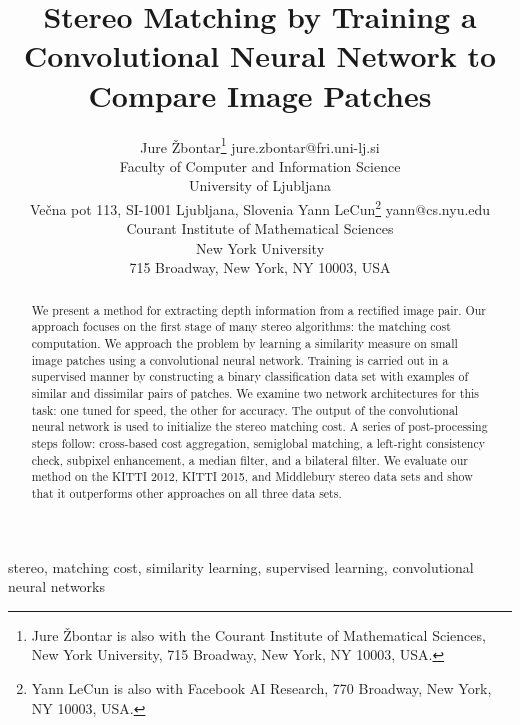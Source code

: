 \documentclass[twoside,11pt]{article}
\begin{document}
\title{Stereo Matching by Training a Convolutional Neural Network to Compare Image Patches}

\author{\name Jure \v{Z}bontar\thanks{
    Jure \v{Z}bontar is also with the
    \addr Courant Institute of Mathematical Sciences,
    New York University,
    715 Broadway, New York, NY 10003, USA.
} \email jure.zbontar@fri.uni-lj.si \\
\addr Faculty of Computer and Information Science\\
University of Ljubljana\\
Ve\v{c}na pot 113, SI-1001 Ljubljana, Slovenia
\AND
\name Yann LeCun\thanks{
    Yann LeCun is also with
    \addr Facebook AI Research,
    770 Broadway, New York, NY 10003, USA.
} \email yann@cs.nyu.edu \\
\addr Courant Institute of Mathematical Sciences\\
New York University\\
715 Broadway, New York, NY 10003, USA}


\maketitle

\begin{abstract}%
We present a method for extracting depth information from a rectified image
pair. Our approach focuses on the first stage of many stereo algorithms: the
matching cost computation. We approach the problem by learning a similarity
measure on small image patches using a convolutional neural network. Training
is carried out in a supervised manner by constructing a binary classification
data set with examples of similar and dissimilar pairs of patches. We examine
two network architectures for this task: one tuned for speed, the other for
accuracy. The output of the convolutional neural network is used to initialize
the stereo matching cost. A series of post-processing steps follow: cross-based
cost aggregation, semiglobal matching, a left-right consistency check, subpixel
enhancement, a median filter, and a bilateral filter. We evaluate our method on
the KITTI 2012, KITTI 2015, and Middlebury stereo data sets and show that it
outperforms other approaches on all three data sets.

\end{abstract}

\begin{keywords}
stereo, matching cost, similarity learning, supervised learning, convolutional
neural networks

\end{keywords}
\end{document}
